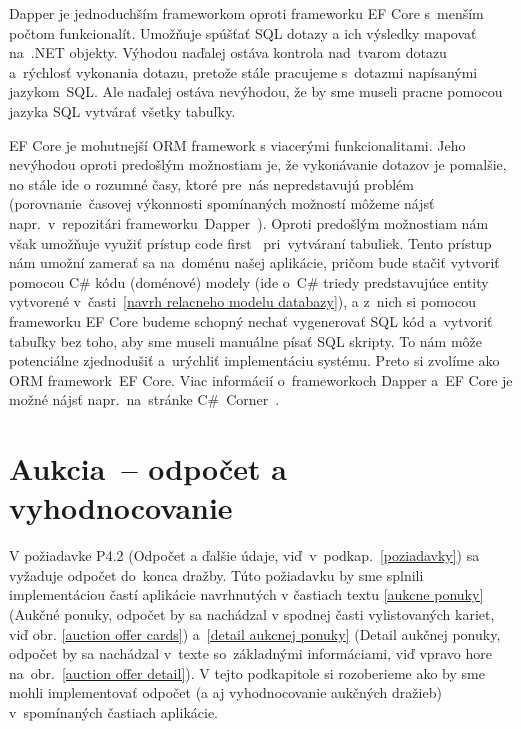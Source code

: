 Dapper je jednoduchším frameworkom oproti frameworku EF Core s~menším počtom funkcionalít. Umožňuje spúšťať SQL dotazy a ich výsledky mapovať na~.NET objekty. Výhodou naďalej ostáva kontrola nad~tvarom dotazu a~rýchlosť vykonania dotazu, pretože stále pracujeme s~dotazmi napísanými jazykom~SQL. Ale naďalej ostáva nevýhodou, že by sme museli pracne pomocou jazyka SQL vytvárať všetky tabuľky.

EF Core je mohutnejší ORM framework s viacerými funkcionalitami. Jeho nevýhodou oproti predošlým možnostiam je, že vykonávanie dotazov je pomalšie, no stále ide o rozumné časy, ktoré pre~nás nepredstavujú problém (porovnanie~časovej výkonnosti spomínaných možností môžeme nájsť napr.~v~repozitári frameworku~Dapper~\cite{dapper repo}). Oproti predošlým možnostiam nám však umožňuje využiť prístup code first~\cite{code first} pri~vytváraní tabuliek. Tento prístup nám umožní zamerať sa na~doménu našej aplikácie, pričom bude stačiť vytvoriť pomocou C\# kódu (doménové) modely (ide o~C\# triedy predstavujúce entity vytvorené v~časti~\ref{navrh relacneho modelu databazy}), a z~nich si pomocou frameworku EF Core budeme schopný nechať vygenerovať SQL kód a~vytvoriť tabuľky bez toho, aby sme museli manuálne písať SQL skripty. To nám môže potenciálne zjednodušiť a~urýchliť implementáciu systému. Preto si zvolíme ako ORM framework~EF Core. Viac informácií o~frameworkoch Dapper a~EF Core je možné nájsť napr.~na~stránke C\#~Corner~\cite{csharp corner}.

\section{Aukcia~-- odpočet a vyhodnocovanie}
\label{aukcia odpocet a vyhodnocovanie}

V požiadavke P4.2 (Odpočet a ďalšie údaje, viď~v~podkap.~\ref{poziadavky}) sa vyžaduje odpočet do~konca dražby. Túto požiadavku by sme splnili implementáciou častí aplikácie navrhnutých v častiach textu \ref{aukcne ponuky} (Aukčné ponuky, odpočet by sa nachádzal v spodnej časti vylistovaných kariet, viď obr. \ref{auction offer cards}) a~\ref{detail aukcnej ponuky} (Detail aukčnej ponuky, odpočet by sa nachádzal v~texte so~základnými informáciami, viď vpravo hore na~obr.~\ref{auction offer detail}). V tejto podkapitole si rozoberieme ako by sme mohli implementovať odpočet (a aj vyhodnocovanie aukčných dražieb) v~spomínaných častiach aplikácie.

